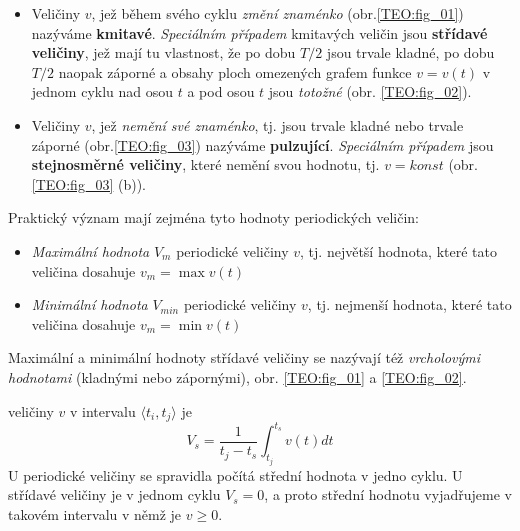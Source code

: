     \begin{itemize}
      \item Veličiny $v$, jež během svého cyklu \emph{změní znaménko} (obr.\ref{TEO:fig_01})
            nazýváme \textbf{kmitavé}. \emph{Speciálním případem} kmitavých veličin jsou
            \textbf{střídavé veličiny}, jež mají tu vlastnost, že po dobu $T/2$ jsou trvale kladné,
            po dobu $T/2$ naopak záporné a obsahy ploch omezených grafem funkce $v=v(t)$ v jednom
            cyklu nad osou $t$ a pod osou $t$ jsou \emph{totožné} (obr. \ref{TEO:fig_02}).
      \item Veličiny $v$, jež \emph{nemění své znaménko}, tj. jsou trvale kladné nebo trvale
            záporné (obr.\ref{TEO:fig_03}) nazýváme \textbf{pulzující}. \emph{Speciálním případem}
            jsou \textbf{stejnosměrné veličiny}, které nemění svou hodnotu, tj. $v=konst$
            (obr.\ref{TEO:fig_03} (b)).
    \end{itemize} 

          
    Praktický význam mají zejména tyto hodnoty periodických veličin:
    \begin{itemize}
      \item \emph{Maximální hodnota} $V_m$ periodické veličiny $v$, tj. největší hodnota, které
            tato veličina dosahuje $v_m=\max v(t)$
      \item \emph{Minimální hodnota} $V_{min}$ periodické veličiny $v$, tj. nejmenší hodnota, které
            tato veličina dosahuje $v_m=\min v(t)$
    \end{itemize}
      
    Maximální a minimální hodnoty střídavé veličiny se nazývají též \emph{vrcholovými hodnotami}
    (kladnými nebo zápornými), obr. \ref{TEO:fig_01} a \ref{TEO:fig_02}. 
    
     veličiny $v$ v intervalu $\langle t_i, t_j\rangle$ je 
    \begin{equation}\label{TEO:eq_harm03}
      V_s = \frac{1}{t_j-t_s}\int_{t_j}^{t_s}v(t)dt
    \end{equation}
    U periodické veličiny se spravidla počítá střední hodnota v jedno cyklu. U střídavé veličiny je
    v jednom cyklu $V_s = 0$,  a proto střední hodnotu vyjadřujeme v takovém intervalu v němž je
    $v\geq0$.
    
